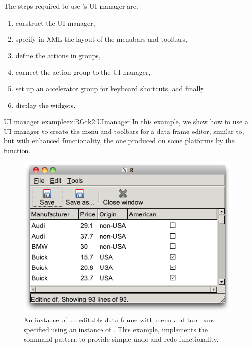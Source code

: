 The steps required to use \GTK's UI manager are:
\begin{enumerate}
\item construct the UI manager,
\item specify in XML the layout of the menubars and toolbars,
\item define the actions in groups,
\item connect the action group to the UI manager, 
\item set up an accelerator group for keyboard shortcuts, 
and finally
\item display the widgets.
\end{enumerate}

\begin{example}{UI manager example}{ex:RGtk2:UImanager}
In this example, we show how to use a UI manager to create the menu
and toolbars for a data frame editor, similar to, but with enhanced
functionality, the one produced on some platforms by the
 function. 


\begin{figure}
  \centering
  \includegraphics[width=.7\textwidth]{fig-RGtk2-editable-dataframe}
  \caption{An instance of an editable data frame with menu and tool
    bars specified using an instance of . This
    example, implements the command pattern to provide simple undo and
    redo functionality.}
  \label{fig:RGtk2-editable-dataframe}
\end{figure}






\end{example}
